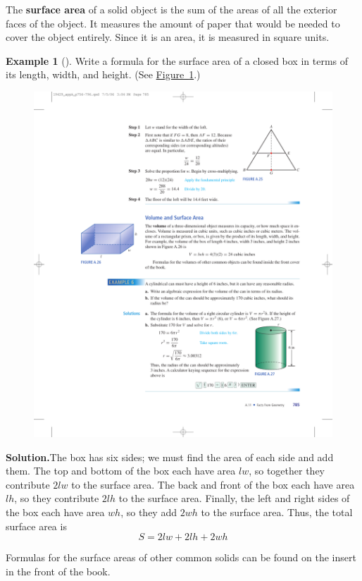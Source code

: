 \documentclass[10pt,]{book}
\newcommand{\terminology}[1]{\textbf{#1}}
\theoremstyle{plain}
\theoremstyle{definition}
\theoremstyle{definition}
\newtheorem{example}[theorem]{Example}
\theoremstyle{definition}
\numberwithin{equation}{part}
\begin{document}
\par
The \terminology{surface area} of a solid object is the sum of the areas of all the exterior faces of the object. It measures the amount of paper that would be needed to cover the object entirely. Since it is an area, it is measured in square units.%
\begin{example}[]\label{example-85}
Write a formula for the surface area of a closed box in terms of its length, width, and height. (See \hyperref[fig-box2a]{Figure~\ref{fig-box2a}}.) \leavevmode%
\begin{figure}
\centering
\includegraphics[width=0.4\linewidth]{images/fig-box2}
\caption{\label{fig-box2a}}
\end{figure}
%
\par\medskip\noindent%
\textbf{Solution.}\quad The box has six sides; we must find the area of each side and add them. The top and bottom of the box each have area \(lw\), so together they contribute \(2lw\) to the surface area. The back and front of the box each have area \(lh\), so they contribute \(2lh\) to the surface area. Finally, the left and right sides of the box each have area \(wh\), so they add \(2wh\) to the surface area. Thus, the total surface area is%
\begin{equation*}
S = 2lw + 2lh + 2wh
\end{equation*}
%
\end{example}
\par
Formulas for the surface areas of other common solids can be found on the insert in the front of the book.%
\typeout{************************************************}
\typeout{************************************************}
\end{document}
